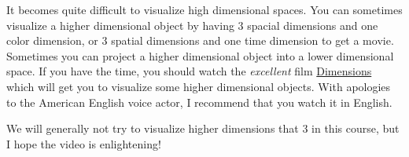 \documentclass{ximera}
\begin{document}
It becomes quite difficult to visualize high dimensional spaces.  
You can sometimes visualize a higher dimensional object by having $3$ spacial dimensions and one color dimension, or $3$ spatial dimensions and one time 
dimension to get a movie.  Sometimes you can project a higher dimensional object into a lower dimensional space.  If you have the time, you should watch the 
\textit{excellent} film \href{http://www.dimensions-math.org/}{Dimensions}  which will get you to visualize some higher dimensional objects.  
With apologies to the American English voice actor, I recommend that you watch it in English.

We will generally not try to visualize higher dimensions that $3$ in this course, but I hope the video is enlightening!
\end{document}
